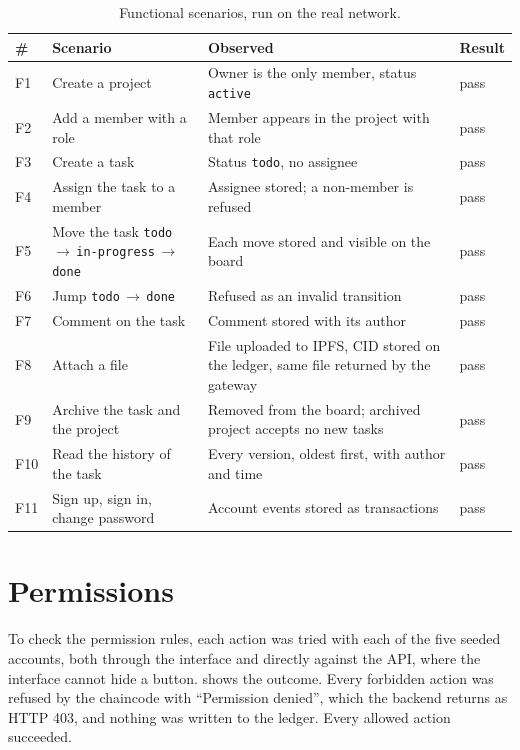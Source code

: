 \begin{table}[htbp]
    \centering
    \small
    \begin{tabular}{p{0.6cm}p{5.4cm}p{5.0cm}p{0.9cm}}
        \toprule
        \# & Scenario & Observed & Result \\
        \midrule
        F1 & Create a project & Owner is the only member, status \texttt{active} & pass \\
        F2 & Add a member with a role & Member appears in the project with that role & pass \\
        F3 & Create a task & Status \texttt{todo}, no assignee & pass \\
        F4 & Assign the task to a member & Assignee stored; a non-member is refused & pass \\
        F5 & Move the task \texttt{todo}\,$\rightarrow$\,\texttt{in-progress}\,$\rightarrow$\,\texttt{done} & Each move stored and visible on the board & pass \\
        F6 & Jump \texttt{todo}\,$\rightarrow$\,\texttt{done} & Refused as an invalid transition & pass \\
        F7 & Comment on the task & Comment stored with its author & pass \\
        F8 & Attach a file & File uploaded to IPFS, CID stored on the ledger, same file returned by the gateway & pass \\
        F9 & Archive the task and the project & Removed from the board; archived project accepts no new tasks & pass \\
        F10 & Read the history of the task & Every version, oldest first, with author and time & pass \\
        F11 & Sign up, sign in, change password & Account events stored as transactions & pass \\
        \bottomrule
    \end{tabular}
    \caption{Functional scenarios, run on the real network.}
    \label{tab:scenarios}
\end{table}

\section{Permissions}
\label{sec:results-permissions}

To check the permission rules, each action was tried with each of the five seeded accounts, both through the interface and directly against the API, where the interface cannot hide a button.  shows the outcome. Every forbidden action was refused by the chaincode with ``Permission denied'', which the backend returns as HTTP 403, and nothing was written to the ledger. Every allowed action succeeded.

